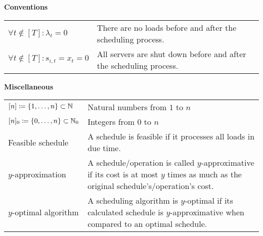 \large{\textbf{Conventions}}
\begin{longtable}{p{} p{}}
  $\forall t\notin[T]:\lambda_t=0$ & There are no loads before and after the scheduling process.\\  
  $\forall t\notin[T]:s_{i,t}=x_t=0$ & All servers are shut down before and after the scheduling process.
\end{longtable}
\large{\textbf{Miscellaneous}}
\begin{longtable}{p{} p{}}
  $[n]\coloneqq\{1,\dotsc,n\}\subset\mathbb{N}$&Natural numbers from $1$ to $n$\\
  $[n]_0\coloneqq\{0,\dotsc,n\}\subset\mathbb{N}_0$&Integers from $0$ to $n$\\
  Feasible schedule&A schedule is feasible if it processes all loads in due time.\\
  $y$-approximation&A schedule/operation is called $y$-approximative if its cost is at most $y$ times as much as the original schedule's/operation's cost.\\
  $y$-optimal algorithm&A scheduling algorithm is $y$-optimal if its calculated schedule is $y$-approximative when compared to an optimal schedule.
\end{longtable}
\egroup
